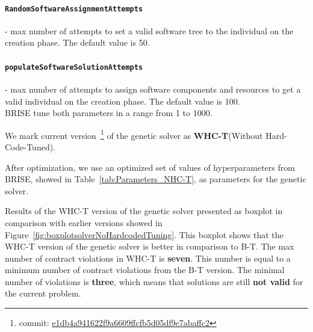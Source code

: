 \paragraph{\texttt{RandomSoftwareAssignmentAttempts}} - max number of attempts to set a valid software tree to the individual on the creation phase. The default value is 50.
\paragraph{\texttt{populateSoftwareSolutionAttempts}} -  max number of attempts to assign software components and resources to get a valid individual on the creation phase. The default value is 100.\\

BRISE tune both parameters in a range from 1 to 1000.

We mark current version~\footnote{commit: \href{https://git-st.inf.tu-dresden.de/mquat/mquat2/commit/e1db4a941622f9a6609ffcfb5d05df9e7abaffc2}{e1db4a941622f9a6609ffcfb5d05df9e7abaffc2}} of the genetic solver as \textbf{WHC-T}(Without Hard-Code-Tuned).

After optimization, we use an optimized set of values of hyperparameters from BRISE, showed in Table~\ref{tab:Parameters_NHC-T}, as parameters for the genetic solver. 

\begin{table}
	\centering
	\caption{Parameters of WHC-T version of the genetic solver}\label{tab:Parameters_NHC-T}
\end{table}

Results of the WHC-T version of the genetic solver presented as boxplot in comparison with earlier versions showed in Figure~\ref{fig:boxplotsolverNoHardcodedTuning}. This boxplot shows that the WHC-T version of the genetic solver is better in comparison to B-T. The max number of contract violations in WHC-T is \textbf{seven}. This number is equal to a minimum number of contract violations from the B-T version. The minimal number of violations is \textbf{three}, which means that solutions are still \textbf{not valid} for the current problem. 

